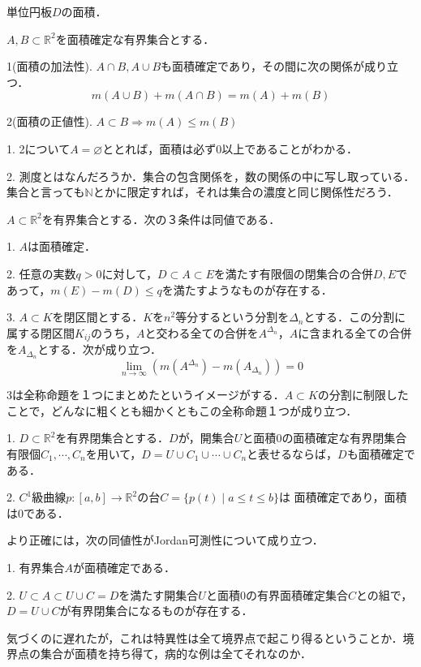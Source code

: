 \documentclass[uplatex, dvipdfmx]{jsreport}
\begin{document}
\begin{example}
    単位円板$D$の面積．
\end{example}

\begin{proposition}[面積の加法性と正値性]
    $A,B\subset\mathbb{R}^2$を面積確定な有界集合とする．

    1(面積の加法性). $A\cap B,A\cup B$も面積確定であり，その間に次の関係が成り立つ．
    \[ m(A\cup B)+m(A\cap B) = m(A)+m(B) \]

    2(面積の正値性). $A\subset B\Rightarrow m(A)\le m(B)$
\end{proposition}
\begin{remark*}
    1. 2について$A=\varnothing$ととれば，面積は必ず$0$以上であることがわかる．

    2. 測度とはなんだろうか．集合の包含関係を，数の関係の中に写し取っている．集合と言っても$\mathbb{N}$とかに限定すれば，それは集合の濃度と同じ関係性だろう．
\end{remark*}

\begin{proposition}[Jordan可測性の特徴付け２]
    $A\subset\mathbb{R}^2$を有界集合とする．次の３条件は同値である．

    1. $A$は面積確定．

    2. 任意の実数$q>0$に対して，$D\subset A\subset E$を満たす有限個の閉集合の合併$D,E$であって，$m(E)-m(D)\le q$を満たすようなものが存在する．

    3. $A\subset K$を閉区間とする．$K$を$n^2$等分するという分割を$\Delta_n$とする．この分割に属する閉区間$K_{ij}$のうち，$A$と交わる全ての合併を$A^{\Delta_n}$，$A$に含まれる全ての合併を$A_{\Delta_n}$とする．次が成り立つ．
    \[ \lim_{n\to\infty}(m(A^{\Delta_n})-m(A_{\Delta_n}))=0 \]
\end{proposition}
\begin{remark*}
    3は全称命題を１つにまとめたというイメージがする．$A\subset K$の分割に制限したことで，どんなに粗くとも細かくともこの全称命題１つが成り立つ．
\end{remark*}

\begin{proposition}[$C^1$級曲線で囲まれた部分は面積確定である．]\label{prop-Jordan-measure-charact}
    1. $D\subset\mathbb{R}^2$を有界閉集合とする．$D$が，開集合$U$と面積$0$の面積確定な有界閉集合有限個$C_1,\cdots,C_n$を用いて，$D=U\cup C_1\cup\cdots\cup C_n$と表せるならば，$D$も面積確定である．

    2. $C^1$級曲線$p:[a,b]\to\mathbb{R}^2$の台$C=\{p(t)\mid a\le t\le b\}$は
    面積確定であり，面積は$0$である．
\end{proposition}
\begin{remark*}
    より正確には，次の同値性がJordan可測性について成り立つ．

    1. 有界集合$A$が面積確定である．

    2. $U\subset A\subset U\cup C=D$を満たす開集合$U$と面積$0$の有界面積確定集合$C$との組で，$D=U\cup C$が有界閉集合になるものが存在する．

    気づくのに遅れたが，これは特異性は全て境界点で起こり得るということか．境界点の集合が面積を持ち得て，病的な例は全てそれなのか．
\end{remark*}
\end{document}
